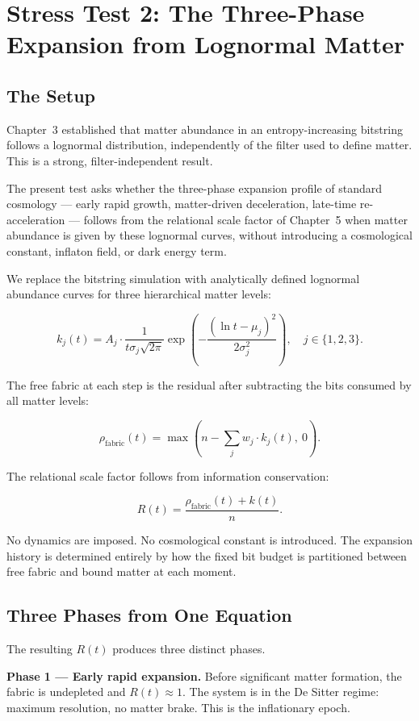 \section{Stress Test 2: The Three-Phase Expansion from Lognormal Matter}

\subsection{The Setup}

Chapter~3 established that matter abundance in an entropy-increasing
bitstring follows a lognormal distribution, independently of the filter
used to define matter. This is a strong, filter-independent result.

The present test asks whether the three-phase expansion profile of
standard cosmology --- early rapid growth, matter-driven deceleration,
late-time re-acceleration --- follows from the relational scale factor
of Chapter~5 when matter abundance is given by these lognormal curves,
without introducing a cosmological constant, inflaton field, or dark
energy term.

We replace the bitstring simulation with analytically defined lognormal
abundance curves for three hierarchical matter levels:

\[
k_j(t) = A_j \cdot \frac{1}{t\sigma_j\sqrt{2\pi}}
\exp\!\left(-\frac{(\ln t - \mu_j)^2}{2\sigma_j^2}\right),
\quad j \in \{1, 2, 3\}.
\]

The free fabric at each step is the residual after subtracting the bits
consumed by all matter levels:

\[
\rho_{\mathrm{fabric}}(t) =
\max\!\left(n - \sum_j w_j \cdot k_j(t),\ 0\right).
\]

The relational scale factor follows from information conservation:

\[
R(t) = \frac{\rho_{\mathrm{fabric}}(t) + k(t)}{n}.
\]

No dynamics are imposed. No cosmological constant is introduced. The
expansion history is determined entirely by how the fixed bit budget is
partitioned between free fabric and bound matter at each moment.

\subsection{Three Phases from One Equation}

The resulting $R(t)$ produces three distinct phases.

\textbf{Phase 1 --- Early rapid expansion.} Before significant matter
formation, the fabric is undepleted and $R(t) \approx 1$. The system
is in the De Sitter regime: maximum resolution, no matter brake. This
is the inflationary epoch.

